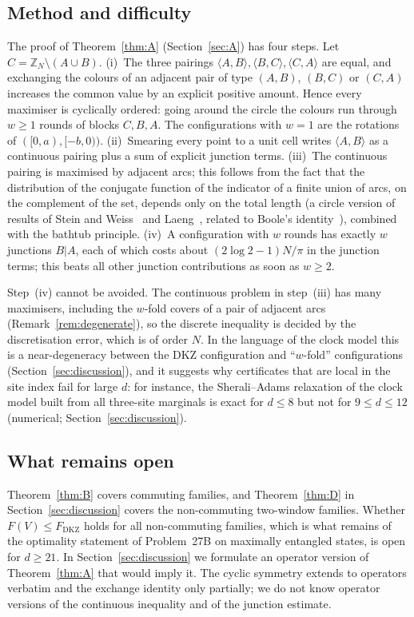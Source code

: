 \documentclass[11pt]{amsart}
\theoremstyle{definition}
\theoremstyle{remark}
\newcommand{\Z}{\mathbb{Z}}
\newcommand{\ip}[2]{\langle #1,#2\rangle}
\newcommand{\FD}{F_{\mathrm{DKZ}}}
\begin{document}
\subsection{Method and difficulty}
The proof of Theorem~\ref{thm:A} (Section~\ref{sec:A}) has four steps. Let $C=\Z_N\setminus(A\cup B)$.
(i)~The three pairings $\ip AB,\ip BC,\ip CA$ are equal, and exchanging the colours of an adjacent pair of type
$(A,B)$, $(B,C)$ or $(C,A)$ increases the common value by an explicit positive amount. Hence every maximiser is
cyclically ordered: going around the circle the colours run through $w\ge1$ rounds of blocks $C,B,A$. The
configurations with $w=1$ are the rotations of $([0,a),[-b,0))$. (ii)~Smearing every point to a unit cell writes
$\ip AB$ as a continuous pairing plus a sum of explicit junction terms. (iii)~The continuous pairing is maximised
by adjacent arcs; this follows from the fact that the distribution of the conjugate function of the indicator
of a finite union of arcs, on the complement of the set, depends only on the total length (a circle version of
results of Stein and Weiss~\cite{SW} and Laeng~\cite{Laeng}, related to Boole's identity~\cite{Boole}), combined
with the bathtub principle. (iv)~A configuration with $w$ rounds has exactly $w$ junctions $B|A$, each of which costs about
$(2\log2-1)N/\pi$ in the junction terms; this beats all other junction contributions as soon as $w\ge2$.

Step~(iv) cannot be avoided. The continuous problem in step~(iii) has many maximisers, including the $w$-fold
covers of a pair of adjacent arcs (Remark~\ref{rem:degenerate}), so the discrete inequality is decided by the
discretisation error, which is of order $N$. In the language of the clock model this is a near-degeneracy between
the DKZ configuration and ``$w$-fold'' configurations (Section~\ref{sec:discussion}), and it suggests why
certificates that are local in the site index fail for large $d$: for instance, the Sherali--Adams relaxation
of the clock model built from all three-site marginals is exact for $d\le8$ but not for $9\le d\le12$
(numerical; Section~\ref{sec:discussion}).

\subsection{What remains open}
Theorem~\ref{thm:B} covers commuting families, and Theorem~\ref{thm:D} in Section~\ref{sec:discussion} covers the
non-commuting two-window families. Whether $F(V)\le\FD$ holds for all non-commuting families, which is what remains
of the optimality statement of Problem~27B on maximally entangled states, is open for $d\ge21$. In
Section~\ref{sec:discussion} we formulate an operator version of Theorem~\ref{thm:A} that would imply it. The
cyclic symmetry extends to operators verbatim and the exchange identity only partially; we do not know operator
versions of the continuous inequality and of the junction estimate.
\end{document}
